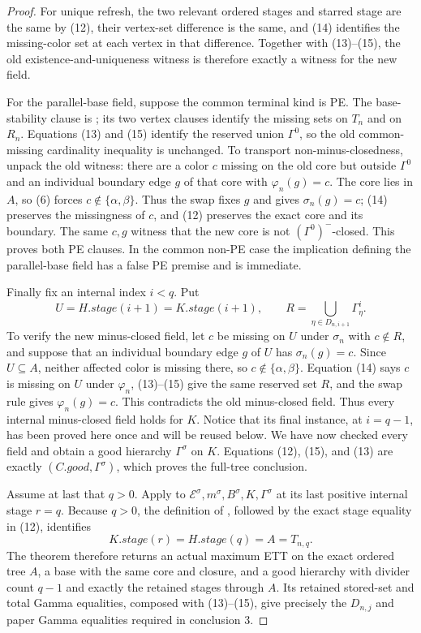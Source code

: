 \begin{proof}
For unique refresh, the two relevant ordered stages and starred stage are
the same by (12), their vertex-set difference is the same, and (14)
identifies the missing-color set at each vertex in that difference.
Together with (13)--(15), the old existence-and-uniqueness witness is
therefore exactly a witness for the new field.

For the parallel-base field, suppose the common terminal kind is PE.
The base-stability clause is ; its two
vertex clauses identify the missing sets on $T_n$ and on $R_n$.
Equations (13) and (15) identify the reserved union $\Gamma^0$, so the
old common-missing cardinality inequality is unchanged.  To transport
non-minus-closedness, unpack the old witness: there are a color $c$
missing on the old core but outside $\Gamma^0$ and an individual boundary
edge $g$ of that core with $\varphi_n(g)=c$.  The core lies in $A$, so
(6) forces $c\notin\{\alpha,\beta\}$.  Thus the swap fixes $g$ and gives
$\sigma_n(g)=c$; (14) preserves the missingness of $c$, and (12)
preserves the exact core and its boundary.  The same $c,g$ witness that
the new core is not $(\Gamma^0)^-$-closed.  This proves both PE clauses.
In the common non-PE case the implication defining the parallel-base
field has a false PE premise and is immediate.

Finally fix an internal index $i<q$.  Put
\[
 U=H.\mathit{stage}(i+1)=K.\mathit{stage}(i+1),\qquad
 R=\bigcup_{\eta\in D_{n,i+1}}\Gamma^i_\eta .
\]
To verify the new minus-closed field, let $c$ be missing on $U$ under
$\sigma_n$ with $c\notin R$, and suppose that an individual boundary edge
$g$ of $U$ has $\sigma_n(g)=c$.  Since $U\subseteq A$, neither affected
color is missing there, so $c\notin\{\alpha,\beta\}$.  Equation (14) says
$c$ is missing on $U$ under $\varphi_n$, (13)--(15) give the same reserved
set $R$, and the swap rule gives $\varphi_n(g)=c$.  This contradicts the
old minus-closed field.  Thus every internal minus-closed field holds for
$K$.  Notice that its final instance, at $i=q-1$, has been proved here
once and will be reused below.  We have now checked every field and obtain
a good hierarchy $\Gamma^\sigma$ on $K$.  Equations (12), (15), and (13)
are exactly $(C.\mathit{good},\Gamma^\sigma)$,
which proves the full-tree conclusion.                                

Assume at last that $q>0$.  Apply
 to
$\mathcal E^\sigma,m^\sigma,B^\sigma,K,\Gamma^\sigma$ at its last
positive internal stage $r=q$.  Because $q>0$, the definition of
, followed by the exact stage equality in
(12), identifies
\[
 K.\mathit{stage}(r)=H.\mathit{stage}(q)=A=T_{n,q}.
\]
The theorem therefore returns an actual maximum ETT on the exact ordered
tree $A$, a base with the same core and closure, and a good hierarchy with
divider count $q-1$ and exactly the retained stages through $A$.  Its
retained stored-set and total Gamma equalities, composed with (13)--(15),
give precisely the $D_{n,j}$ and paper Gamma equalities required in
conclusion 3.


\end{proof}
